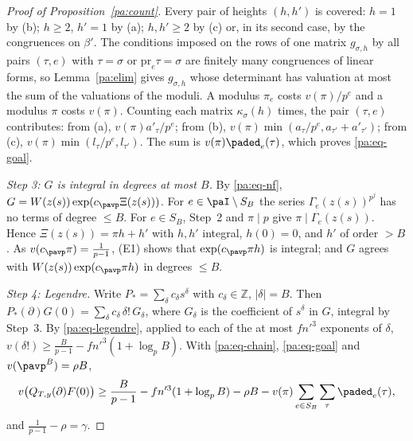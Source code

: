 \documentclass[10pt]{amsart}
\theoremstyle{definition}
\theoremstyle{remark}
\newcommand{\Z}{\mathbb Z}
\begin{document}
\begin{proof}[Proof of Proposition~\ref{pa:count}]
Every pair of heights $(h,h')$ is covered: $h=1$ by (b); $h\ge2$, $h'=1$ by (a); $h,h'\ge2$ by
(c) or, in its second case, by the congruences on $\beta'$. The conditions imposed on the rows of
one matrix $g_{\sigma,h}$ by all pairs $(\tau,e)$ with $\tau=\sigma$ or $\mathrm{pr}_e\tau=\sigma$
are finitely many congruences of linear forms, so Lemma~\ref{pa:elim} gives $g_{\sigma,h}$ whose
determinant has valuation at most the sum of the valuations of the moduli. A modulus $\pi_e$ costs
$v(\pi)/p^e$ and a modulus $\pi$ costs $v(\pi)$. Counting each matrix $\kappa_\sigma(h)$ times, the
pair $(\tau,e)$ contributes: from (a), $v(\pi)a'_\tau/p^e$; from (b),
$v(\pi)\min(a_\tau/p^e,a_{\tau'}+a'_{\tau'})$; from (c), $v(\pi)\min(l_\tau/p^e,l_{\tau'})$. The
sum is $v(\pi)\paded_e(\tau)$, which proves \eqref{pa:eq-goal}.

\emph{Step 3: $G$ is integral in degrees at most $B$.} By \eqref{pa:eq-nf},
$G=W(z(s))\exp(c_\pavp\Xi(z(s)))$. For $e\in\paI\setminus S_B$ the series $\Gamma_e(z(s))^{p^j}$ has
no terms of degree $\le B$. For $e\in S_B$, Step~2 and $\pi\mid p$ give
$\pi\mid\Gamma_e(z(s))$. Hence $\Xi(z(s))=\pi h+h'$ with $h,h'$ integral, $h(0)=0$, and $h'$ of
order $>B$. As $v(c_\pavp\pi)=\frac1{p-1}$, (E1) shows that $\exp(c_\pavp\pi h)$ is integral; and
$G$ agrees with $W(z(s))\exp(c_\pavp\pi h)$ in degrees $\le B$.

\emph{Step 4: Legendre.} Write $P_*=\sum_\delta c_\delta s^\delta$ with $c_\delta\in\Z$,
$|\delta|=B$. Then $P_*(\partial)G(0)=\sum_\delta c_\delta\,\delta!\,G_\delta$, where $G_\delta$ is
the coefficient of $s^\delta$ in $G$, integral by Step~3. By \eqref{pa:eq-legendre}, applied to each
of the at most $fn'^3$ exponents of $\delta$,
$v(\delta!)\ge\frac B{p-1}-fn'^3(1+\log_pB)$. With \eqref{pa:eq-chain}, \eqref{pa:eq-goal} and
$v(\pavp^B)=\rho B$,
\[
v\bigl(Q_{T,y}(\partial)F(0)\bigr)\ge\frac B{p-1}-fn'^3(1+\log_pB)-\rho B-v(\pi)\sum_{e\in S_B}
\sum_\tau\paded_e(\tau),
\]
and $\frac1{p-1}-\rho=\gamma$.
\end{proof}
\end{document}
